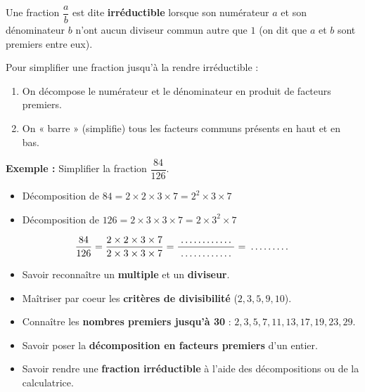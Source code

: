 \begin{cadredef}
Une fraction $\dfrac{a}{b}$ est dite \textbf{irréductible} lorsque son numérateur $a$ et son dénominateur $b$ n'ont aucun diviseur commun autre que $1$ (on dit que $a$ et $b$ sont premiers entre eux).
\end{cadredef}

\begin{cadremethode}
Pour simplifier une fraction jusqu'à la rendre irréductible :
\begin{enumerate}
    \item On décompose le numérateur et le dénominateur en produit de facteurs premiers.
    \item On « barre » (simplifie) tous les facteurs communs présents en haut et en bas.
\end{enumerate}

\textbf{Exemple :} Simplifier la fraction $\dfrac{84}{126}$.
\begin{itemize}
    \item Décomposition de $84 = 2 \times 2 \times 3 \times 7 = 2^2 \times 3 \times 7$
    \item Décomposition de $126 = 2 \times 3 \times 3 \times 7 = 2 \times 3^2 \times 7$
\end{itemize}
\[ \frac{84}{126} = \frac{2 \times 2 \times 3 \times 7}{2 \times 3 \times 3 \times 7} = \frac{\pointille[2cm]}{\pointille[2cm]} = \pointille[1.5cm] \]
\end{cadremethode}

\begin{cadreretenu}
\begin{itemize}
    \item Savoir reconnaître un \textbf{multiple} et un \textbf{diviseur}.
    \item Maîtriser par coeur les \textbf{critères de divisibilité} ($2, 3, 5, 9, 10$).
    \item Connaître les \textbf{nombres premiers jusqu'à 30} : $2, 3, 5, 7, 11, 13, 17, 19, 23, 29$.
    \item Savoir poser la \textbf{décomposition en facteurs premiers} d'un entier.
    \item Savoir rendre une \textbf{fraction irréductible} à l'aide des décompositions ou de la calculatrice.
\end{itemize}
\end{cadreretenu}

